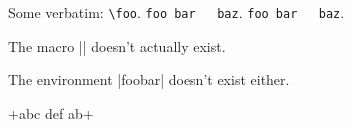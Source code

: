 \documentclass{nlctdoc}
\begin{document}
Some verbatim: \verb"\foo". \verb*"foo bar   baz".
\verb"foo bar   baz".

\index{\foo}

\DescribeMacro{\foo}The macro |\foo| doesn't actually exist.

The environment |foobar| doesn't exist either.

\MakeShortVerb*{+}


+abc def  ab+

\PrintIndex
\end{document}
